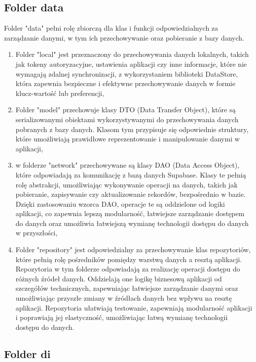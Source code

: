 \documentclass[12pt,twoside]{article}
\begin{document}
\subsection{Folder data}

Folder "data" pełni rolę zbiorczą dla klas i funkcji odpowiedzialnych za zarządzanie danymi, w tym ich przechowywanie 
oraz pobieranie z bazy danych.
\begin{samepage}
\begin{enumerate}[label=\alph*), leftmargin=1.25cm]
	\item Folder "local" jest przeznaczony do przechowywania danych lokalnych, takich jak tokeny autoryzacyjne, 
	ustawienia aplikacji czy inne informacje, które nie wymagają zdalnej synchronizacji, z wykorzystaniem biblioteki 
	DataStore, która zapewnia bezpieczne i efektywne przechowywanie danych w formie klucz-wartość lub preferencji,
	\item Folder "model" przechowuje klasy DTO (Data Transfer Object), które są serializowanymi obiektami 
	wykorzystywanymi do przechowywania danych pobranych z bazy danych. Klasom tym przypisuje się odpowiednie 
	struktury, które umożliwiają prawidłowe reprezentowanie i manipulowanie danymi w aplikacji,
	\item w folderze "network" przechowywane są klasy DAO (Data Access Object), które odpowiadają za komunikację z 
	bazą danych Supabase. Klasy te pełnią rolę abstrakcji, umożliwiając wykonywanie operacji na danych, takich jak 
	pobieranie, zapisywanie czy aktualizowanie rekordów, bezpośrednio w bazie. Dzięki zastosowaniu wzorca DAO, 
	operacje te są oddzielone od logiki aplikacji, co zapewnia lepszą modularność, łatwiejsze zarządzanie dostępem do 
	danych oraz umożliwia łatwiejszą wymianę technologii dostępu do danych w przyszłości,
	\item Folder "repository" jest odpowiedzialny za przechowywanie klas repozytoriów, które pełnią rolę pośredników 
	pomiędzy warstwą danych a resztą aplikacji. Repozytoria w tym folderze odpowiadają za realizację operacji dostępu 
	do różnych źródeł danych. Oddzielają one logikę biznesową aplikacji od szczegółów technicznych, zapewniając 
	łatwiejsze zarządzanie danymi oraz umożliwiając przyszłe zmiany w źródłach danych bez wpływu na resztę aplikacji. 
	Repozytoria ułatwiają testowanie, zapewniają modularność aplikacji i poprawiają jej elastyczność, umożliwiając 
	łatwą wymianę technologii dostępu do danych.
\end{enumerate}
\end{samepage}
\subsection{Folder di}
\end{document}
